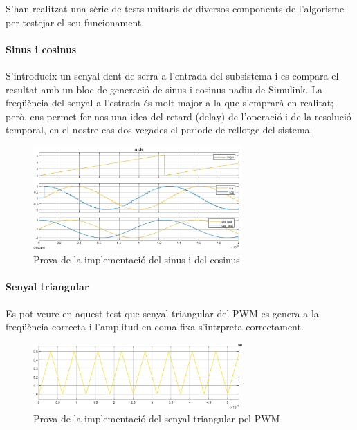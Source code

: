 {
    S'han realitzat una sèrie de tests unitaris de diversos components de
    l'algorisme per testejar el seu funcionament.

    \paragraph{Sinus i cosinus} S'introdueix un senyal dent de serra a
        l'entrada del subsistema i es compara el resultat amb un bloc de
        generació de sinus i cosinus nadiu de Simulink. La freqüència del
        senyal a l'estrada és molt major a la que s'emprarà en realitat; però,
        ens permet fer-nos una idea del retard (delay) de l'operació i de la
        resolució temporal, en el nostre cas dos vegades el periode de rellotge
        del sistema.

        \begin{figure}[!htb]
            \centering
            \captionsetup{justification=centering,margin=1.5cm}
            \includegraphics[width=8cm]
                {img/5_resultats/sineLUT_test.png}
            \caption{ Prova de la implementació del sinus i del cosinus }
        \end{figure}
    

    \paragraph{Senyal triangular} Es pot veure en aquest test que senyal
        triangular del PWM es genera a la freqüència correcta i l'amplitud en
        coma fixa s'intrpreta correctament.
    
        \begin{figure}[!htb]
            \centering
            \captionsetup{justification=centering,margin=1.5cm}
            \includegraphics[width=8cm]
                {img/5_resultats/triangular.png}
            \caption{ Prova de la implementació del senyal triangular pel PWM }
        \end{figure}     
    

}
